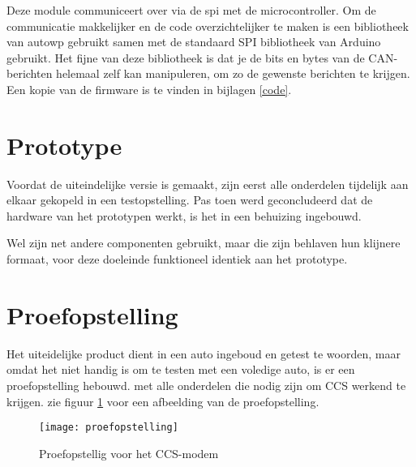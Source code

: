Deze module communiceert over via de \ac{spi} met de microcontroller. Om de
communicatie makkelijker en de code overzichtelijker te maken is een
bibliotheek van autowp gebruikt \cite{autowp} samen met de standaard SPI
bibliotheek van Arduino gebruikt. Het fijne van deze bibliotheek is dat je de
bits en bytes van de CAN-berichten helemaal zelf kan manipuleren, om zo de
gewenste berichten te krijgen. Een kopie van de firmware is te vinden in
bijlagen \ref{code}.

\section{Prototype}

Voordat de uiteindelijke versie is gemaakt, zijn eerst alle onderdelen
tijdelijk aan elkaar gekopeld in een testopstelling. Pas toen werd
geconcludeerd dat de hardware van het prototypen werkt, is het in een behuizing
ingebouwd.

Wel zijn net andere componenten gebruikt, maar die zijn behlaven hun klijnere
formaat, voor deze doeleinde funktioneel identiek aan het prototype.

\section{Proefopstelling}
\label{sec:proefopstelling}

Het uiteidelijke product dient in een auto ingeboud en getest te woorden, maar
omdat het niet handig is om te testen met een voledige auto, is er een
proefopstelling hebouwd. met alle onderdelen die nodig zijn om CCS werkend te
krijgen. zie figuur \ref{fig:proefopstelling} voor een afbeelding van de
proefopstelling.

\begin{figure}[]
    \centering
    \texttt{[image: proefopstelling]}
    \caption{Proefopstellig voor het CCS-modem}
    \label{fig:proefopstelling}
\end{figure}
